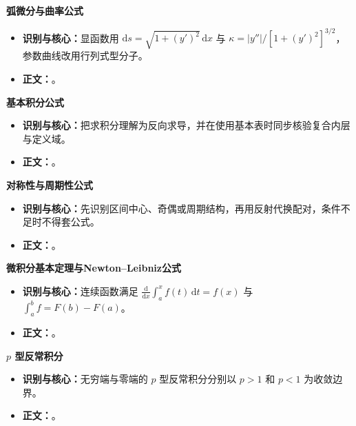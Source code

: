\begin{knowledgeBox}
\textbf{弧微分与曲率公式}

\begin{itemize}
  \item \textbf{识别与核心：}显函数用 \(\mathrm ds=\sqrt{1+(y')^2}\,\mathrm dx\) 与 \(\kappa=|y''|/[1+(y')^2]^{3/2}\)，参数曲线改用行列式型分子。
  \item \textbf{正文：}。
\end{itemize}

\textbf{基本积分公式}

\begin{itemize}
  \item \textbf{识别与核心：}把求积分理解为反向求导，并在使用基本表时同步核验复合内层与定义域。
  \item \textbf{正文：}。
\end{itemize}

\textbf{对称性与周期性公式}

\begin{itemize}
  \item \textbf{识别与核心：}先识别区间中心、奇偶或周期结构，再用反射代换配对，条件不足时不得套公式。
  \item \textbf{正文：}。
\end{itemize}

\textbf{微积分基本定理与Newton–Leibniz公式}

\begin{itemize}
  \item \textbf{识别与核心：}连续函数满足 \(\frac{\mathrm d}{\mathrm dx}\int_a^x f(t)\,\mathrm dt=f(x)\) 与 \(\int_a^b f=F(b)-F(a)\)。
  \item \textbf{正文：}。
\end{itemize}

\textbf{$p$ 型反常积分}

\begin{itemize}
  \item \textbf{识别与核心：}无穷端与零端的 \(p\) 型反常积分分别以 \(p>1\) 和 \(p<1\) 为收敛边界。
  \item \textbf{正文：}。
\end{itemize}


\end{knowledgeBox}
